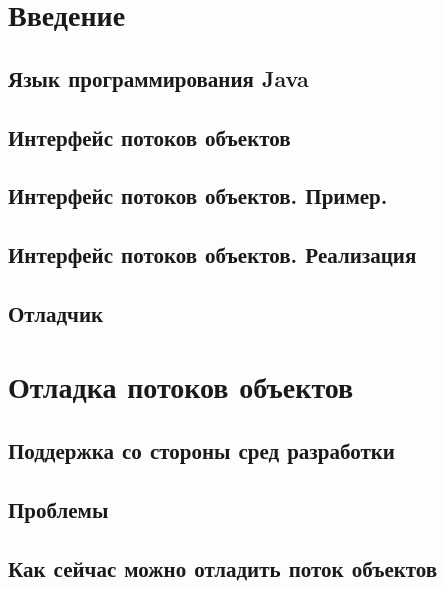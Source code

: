 
%
\section{Введение}
\subsection{Язык программирования Java}



\subsection{Интерфейс потоков объектов}

\subsection{Интерфейс потоков объектов. Пример.}





\subsection{Интерфейс потоков объектов. Реализация}




\subsection{Отладчик}





\section{Отладка потоков объектов}
\subsection{Поддержка со стороны сред разработки}

\subsection{Проблемы}

\subsection{Как сейчас можно отладить поток объектов}

